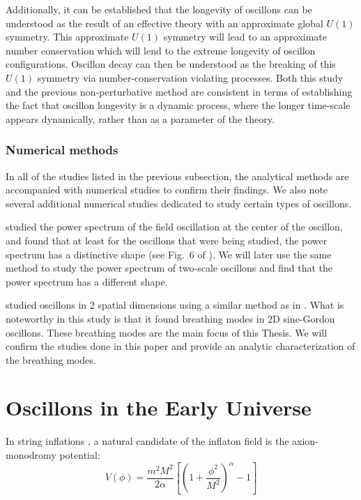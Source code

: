 \documentclass{report}
\begin{document}
Additionally, it can be established \cite{Mukaida:2016hwd} that the longevity of oscillons can be understood as the result of an effective theory with an approximate global $U(1)$ symmetry. This approximate $U(1)$ symmetry will lead to an approximate number conservation which will lend to the extreme longevity of oscillon configurations. Oscillon decay can then be understood as the breaking of this $U(1)$ symmetry via number-conservation violating processes. Both this study and the previous non-perturbative method are consistent in terms of establishing the fact that oscillon longevity is a dynamic process, where the longer time-scale appears dynamically, rather than as a parameter of the theory.

\subsubsection{Numerical methods}
In all of the studies listed in the previous subsection, the analytical methods are accompanied with numerical studies to confirm their findings. We also note several additional numerical studies dedicated to study certain types of oscillons.

\cite{Salmi:2012ta} studied the power spectrum of the field oscillation at the center of the oscillon, and found that at least for the oscillons that were being studied, the power spectrum has a distinctive shape (see Fig.~6 of \cite{Hindmarsh:2006ur}). We will later use the same method to study the power spectrum of two-scale oscillons and find that the power spectrum has a different shape.

\cite{Hindmarsh:2006ur} studied oscillons in 2 spatial dimensions using a similar method as in \cite{Salmi:2012ta}. What is noteworthy in this study is that it found breathing modes in 2D sine-Gordon oscillons. These breathing modes are the main focus of this Thesis. We will confirm the studies done in this paper and provide an analytic characterization of the breathing modes.

\section{Oscillons in the Early Universe}\label{litrev:cosmo}
In string inflations \cite{stringInflationBook, McAllister:2008hb, Silverstein:2008sg, Flauger:2009ab}, a natural candidate of the inflaton field is the axion-monodromy potential:
\begin{equation}
  V(\phi) = \frac{m^2M^2}{2\alpha} \left[\left(1+\frac{\phi^2}{M^2}\right)^\alpha -1\right]
\end{equation}
\end{document}
